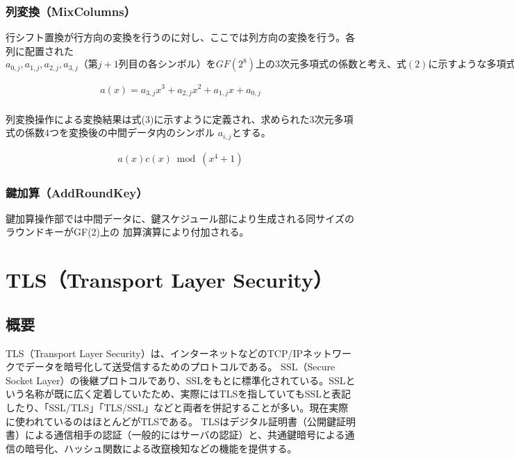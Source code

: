 \documentclass[dvipdfmx,autodetect-engine,titlepage]{jsarticle}
\begin{document}
\subsubsection{列変換（MixColumns）}
行シフト置換が行方向の変換を行うのに対し、ここでは列方向の変換を行う。各列に配置された
\begin{math}
  a_{0,j},a_{1,j},a_{2,j},a_{3,j}（第j+1列目の各シンボル）をGF(2^8)上の3次元多項式
  の係数と考え、式(2)に示すような多項式a(x)を定義する。
\end{math}

\begin{eqnarray}
  a(x) = a_{3,j}x^3 + a_{2,j}x^2 + a_{1,j}x + a_{0,j}
\end{eqnarray}
　\\
列変換操作による変換結果は式(3)に示すように定義され、求められた3次元多項式の係数4つを変換後の中間データ内のシンボル
\begin{math}
  a_{i,j}とする。
\end{math}

\begin{eqnarray}
  a(x)c(x) \bmod (x^4 + 1)
\end{eqnarray}

\subsubsection{鍵加算（AddRoundKey）}
鍵加算操作部では中間データに、鍵スケジュール部により生成される同サイズのラウンドキーがGF(2)上の
加算演算により付加される。

\section{TLS（Transport Layer Security）}
\subsection{概要}
TLS（Transport Layer Security）は、インターネットなどのTCP/IPネットワークでデータを暗号化して送受信するためのプロトコルである。
SSL（Secure Socket Layer）の後継プロトコルであり、SSLをもとに標準化されている。SSLという名称が既に広く定着していたため、実際にはTLSを指していてもSSLと表記したり、「SSL/TLS」「TLS/SSL」などと両者を併記することが多い。現在実際に使われているのはほとんどがTLSである。
TLSはデジタル証明書（公開鍵証明書）による通信相手の認証（一般的にはサーバの認証）と、共通鍵暗号による通信の暗号化、ハッシュ関数による改竄検知などの機能を提供する。
\\
\end{document}
